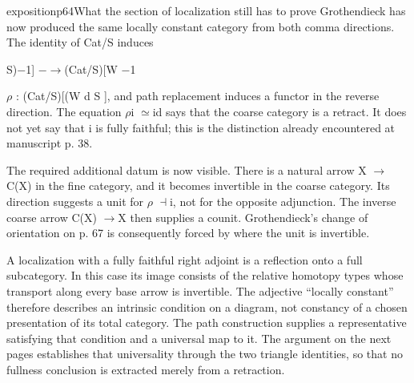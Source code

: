 \begin{dcomment}{exposition}{p64}{What the section of localization still has to prove}
Grothendieck has now produced the same locally constant category from both comma directions. The identity of Cat/S induces

S)\ensuremath{-}1] \ensuremath{-}\ensuremath{\to}(Cat/S)[W \ensuremath{-}1

\ensuremath{\rho} : (Cat/S)[(W d S ], and path replacement induces a functor in the reverse direction. The equation \ensuremath{\rho}i \ensuremath{\simeq}id says that the coarse category is a retract. It does not yet say that i is fully faithful; this is the distinction already encountered at manuscript p. 38.

The required additional datum is now visible. There is a natural arrow X \ensuremath{\to}C(X) in the fine category, and it becomes invertible in the coarse category. Its direction suggests a unit for \ensuremath{\rho} \ensuremath{\dashv}i, not for the opposite adjunction. The inverse coarse arrow C(X) \ensuremath{\to}X then supplies a counit. Grothendieck’s change of orientation on p. 67 is consequently forced by where the unit is invertible.

A localization with a fully faithful right adjoint is a reflection onto a full subcategory. In this case its image consists of the relative homotopy types whose transport along every base arrow is invertible. The adjective “locally constant” therefore describes an intrinsic condition on a diagram, not constancy of a chosen presentation of its total category. The path construction supplies a representative satisfying that condition and a universal map to it. The argument on the next pages establishes that universality through the two triangle identities, so that no fullness conclusion is extracted merely from a retraction.

\end{dcomment}

